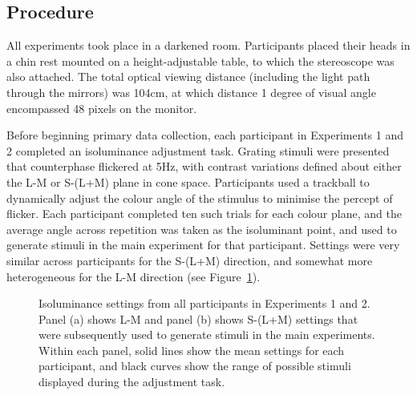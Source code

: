 \documentclass[
  letterpaper,
  DIV=11,
  numbers=noendperiod]{scrartcl}
\begin{document}
\subsection{Procedure}\label{procedure}

All experiments took place in a darkened room. Participants placed their
heads in a chin rest mounted on a height-adjustable table, to which the
stereoscope was also attached. The total optical viewing distance
(including the light path through the mirrors) was 104cm, at which
distance 1 degree of visual angle encompassed 48 pixels on the monitor.

Before beginning primary data collection, each participant in
Experiments 1 and 2 completed an isoluminance adjustment task. Grating
stimuli were presented that counterphase flickered at 5Hz, with contrast
variations defined about either the L-M or S-(L+M) plane in cone space.
Participants used a trackball to dynamically adjust the colour angle of
the stimulus to minimise the percept of flicker. Each participant
completed ten such trials for each colour plane, and the average angle
across repetition was taken as the isoluminant point, and used to
generate stimuli in the main experiment for that participant. Settings
were very similar across participants for the S-(L+M) direction, and
somewhat more heterogeneous for the L-M direction (see
Figure~\ref{fig-isofig}).

\begin{figure}


\caption{\label{fig-isofig}Isoluminance settings from all participants
in Experiments 1 and 2. Panel (a) shows L-M and panel (b) shows S-(L+M)
settings that were subsequently used to generate stimuli in the main
experiments. Within each panel, solid lines show the mean settings for
each participant, and black curves show the range of possible stimuli
displayed during the adjustment task.}

\end{figure}%
\end{document}
